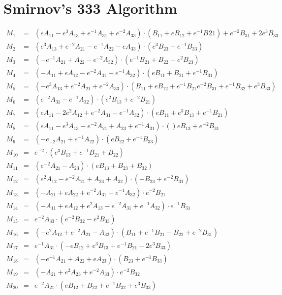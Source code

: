 \documentclass{article}
\begin{document}
\section{Smirnov's 333 Algorithm}
\begin{eqnarray*}
M_1 &=& (eA_{11}-e^3A_{13}+e^{-1}A_{31}+e^{-2}A_{33})\cdot(B_{11}+eB_{12}+e^{-1}B_{}21)+e^{-2}B_{31}+2e^3B_{33}\\
M_2 &=& (e^3A_{13}+e^{-2}A_{21}-e^{-1}A_{22}-eA_{33})\cdot(e^3B_{23}+e^{-1}B_{33})\\
M_3 &=& (-e^{-1}A_{21}+A_{22}-e^{-2}A_{32})\cdot(e^{-1}B_{21}+B_{22}-e^2B_{23})\\
M_4 &=& (-A_{11}+eA_{12}-e^{-2}A_{31}+e^{-1}A_{32})\cdot(eB_{11}+B_{21}+e^{-1}B_{31})\\
M_5 &=& (-e^3A_{13}+e^{-2}A_{21}+e^{-2}A_{33})\cdot(B_{11}+eB_{12}+e^{-1}B_{21}e^{-2}B_{31}+e^{-1}B_{32}+e^3B_{33})\\
M_6 &=& (e^{-2}A_{31}-e^{-1}A_{32})\cdot(e^2B_{13}+e^{-2}B_{21})\\
M_7 &=& (eA_{11}-2e^2A_{12}+e^{-2}A_{31}-e^{-1}A_{32})\cdot(eB_{11}+e^3B_{13}+e^{-1}B_{21})\\
M_8 &=& (eA_{11}-e^3A_{13}-e^{-2}A_{21}+A_{23}+e^{-1}A_{31})\cdot()eB_{13}+e^{-2}B_{31}\\
M_9 &=& (-e_{-2}A_{21}+e^{-1}A_{22})\cdot(eB_{22}+e^{-1}B_{33})\\
M_{10} &=& e^{-2}\cdot(e^3B_{13}+e^{-1}B_{21}+B_{22})\\
M_{11} &=& (e^{-2}A_{21}-A_{23})\cdot(eB_{13}+B_{23}+B_{32})\\
M_{12} &=& (e^2A_{12}-e^{-2}A_{21}+A_{23}+A_{32})\cdot(-B_{23}+e^{-2}B_{31})\\
M_{13} &=& (-A_{21}+eA_{22}+e^{-2}A_{31}-e^{-1}A_{32})\cdot e^{-2}B_{21}\\
M_{14} &=& (-A_{11}+eA_{12}+e^2A_{13}-e^{-2}A_{31}+e^{-1}A_{32})\cdot e^{-1}B_{31}\\
M_{15} &=& e^{-2}A_{33}\cdot(e^{-2}B_{32}-e^2B_{33})\\
M_{16} &=& (-e^2A_{12}+e^{-2}A_{21}-A_{32})\cdot(B_{11}+e^{-1}B_{21}-B_{22}+e^{-2}B_{31})\\
M_{17} &=& e^{-1}A_{31}\cdot(-eB_{12}+e^3B_{13}+e^{-1}B_{21}-2e^{3}B_{33})\\
M_{18} &=& (-e^{-1}A_{21}+A_{22}+eA_{23})\cdot(B_{23}+e^{-1}B_{33})\\
M_{19} &=& (-A_{21}+e^2A_{23}+e^{-2}A_{33})\cdot e^{-2}B_{32}\\
M_{20} &=& e^{-2}A_{21}\cdot(eB_{12}+B_{22}+e^{-1}B_{32}+e^3B_{33})\\\\

\end{eqnarray*}
\end{document}
